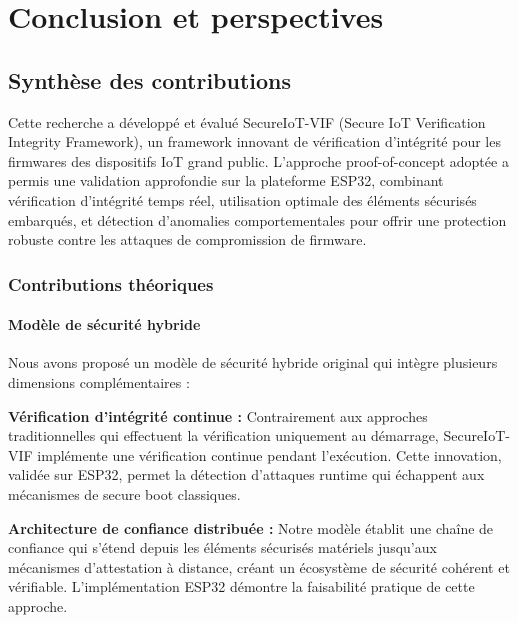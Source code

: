 
\chapter{Conclusion et perspectives}
\label{chap:conclusion}

\section{Synthèse des contributions}

Cette recherche a développé et évalué SecureIoT-VIF (Secure IoT Verification Integrity Framework), un framework innovant de vérification d'intégrité pour les firmwares des dispositifs IoT grand public. L'approche proof-of-concept adoptée a permis une validation approfondie sur la plateforme ESP32, combinant vérification d'intégrité temps réel, utilisation optimale des éléments sécurisés embarqués, et détection d'anomalies comportementales pour offrir une protection robuste contre les attaques de compromission de firmware.

\subsection{Contributions théoriques}

\subsubsection{Modèle de sécurité hybride}

Nous avons proposé un modèle de sécurité hybride original qui intègre plusieurs dimensions complémentaires :

\textbf{Vérification d'intégrité continue :} Contrairement aux approches traditionnelles qui effectuent la vérification uniquement au démarrage, SecureIoT-VIF implémente une vérification continue pendant l'exécution. Cette innovation, validée sur ESP32, permet la détection d'attaques runtime qui échappent aux mécanismes de secure boot classiques.

\textbf{Architecture de confiance distribuée :} Notre modèle établit une chaîne de confiance qui s'étend depuis les éléments sécurisés matériels jusqu'aux mécanismes d'attestation à distance, créant un écosystème de sécurité cohérent et vérifiable. L'implémentation ESP32 démontre la faisabilité pratique de cette approche.

